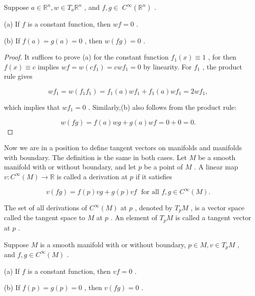 \begin{lemma}
\label{lem:3-1}
\leanok
{}
Suppose $a \in  {\mathbb{R}}^{n}, w \in  {T}_{a}{\mathbb{R}}^{n}$ , and $f, g \in \; {C}^{\infty }\left( {\mathbb{R}}^{n}\right)$ .

(a) If $f$ is a constant function, then ${wf} = 0$ .

(b) If $f\left( a\right)  = g\left( a\right)  = 0$ , then $w\left( {fg}\right)  = 0$ .
\end{lemma}

\begin{proof}
\leanok
It suffices to prove (a) for the constant function ${f}_{1}\left( x\right)  \equiv  1$ , for then $f\left( x\right)  \equiv  c$ implies ${wf} = w\left( {c{f}_{1}}\right)  = {cw}{f}_{1} = 0$ by linearity. For ${f}_{1}$ , the product rule gives

\[
w{f}_{1} = w\left( {{f}_{1}{f}_{1}}\right)  = {f}_{1}\left( a\right) w{f}_{1} + {f}_{1}\left( a\right) w{f}_{1} = {2w}{f}_{1},
\]

which implies that $w{f}_{1} = 0$ . Similarly,(b) also follows from the product rule:

\[
w\left( {fg}\right)  = f\left( a\right) {wg} + g\left( a\right) {wf} = 0 + 0 = 0.
\]
\end{proof}

\begin{definition}
\label{def:3-13-extra-3}
\mathlibok
Now we are in a position to define tangent vectors on manifolds and manifolds with boundary. The definition is the same in both cases. Let $M$ be a smooth manifold with or without boundary, and let $p$ be a point of $M$ . A linear map $v : {C}^{\infty }\left( M\right)  \rightarrow  \mathbb{R}$ is called a derivation at $p$ if it satisfies

\[
v\left( {fg}\right)  = f\left( p\right) {vg} + g\left( p\right) {vf}\;\text{ for all }f, g \in  {C}^{\infty }\left( M\right) . \tag{3.4}
\]

The set of all derivations of ${C}^{\infty }\left( M\right)$ at $p$ , denoted by ${T}_{p}M$ , is a vector space called the tangent space to $M$ at $p$ . An element of ${T}_{p}M$ is called a tangent vector at $p$ .
\end{definition}

\begin{lemma}
\label{lem:3-4}
\leanok
{}
Suppose $M$ is a smooth manifold with or without boundary, $p \in  M, v \in  {T}_{p}M$ , and $f, g \in  {C}^{\infty }\left( M\right)$ .

(a) If $f$ is a constant function, then ${vf} = 0$ .

(b) If $f\left( p\right)  = g\left( p\right)  = 0$ , then $v\left( {fg}\right)  = 0$ .
\end{lemma}

